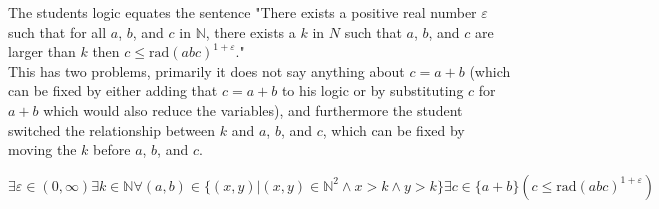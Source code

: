 \documentclass[letterpaper,12pt,addpoints,answers]{exam}
\begin{document}
\begin{questions}
    \begin{solutionorlines}[1in]
        The students logic equates the sentence "There exists a positive real number $\varepsilon$ such that for all $a$, $b$, and $c$ in $\mathbb{N}$, there exists a $k$ in $N$ such that $a$, $b$, and $c$ are larger than $k$ then $c\le \mathrm{rad}(abc)^{1+\varepsilon}$."\\
        This has two problems,
        primarily it does not say anything about $c=a+b$ (which can be fixed by either adding that $c=a+b$ to his logic or by substituting $c$ for $a+b$ which would also reduce the variables),
        and furthermore the student switched the relationship between $k$ and $a$, $b$, and $c$, which can be fixed by moving the $k$ before $a$, $b$, and $c$.

        \[\exists\varepsilon\in (0,\infty)\exists k\in \mathbb N\forall (a,b)\in \{(x,y) | (x, y) \in \mathbb N^2 \land x > k \land y > k\} \exists c \in \{a + b\}(c\le \mathrm{rad}(abc)^{1+\varepsilon}) \]
    \end{solutionorlines}
    \question
\end{questions}
\end{document}
